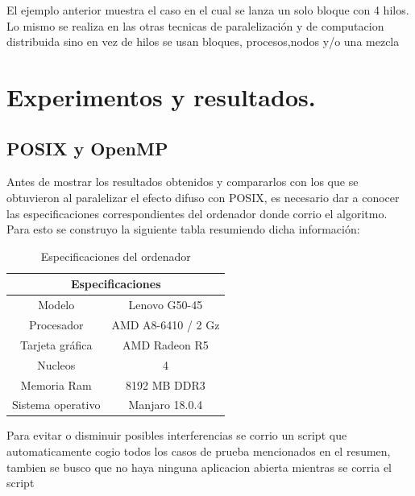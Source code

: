 \documentclass{IEEEtran}
\begin{document}
El ejemplo anterior muestra el caso en el cual se lanza un solo bloque con 4 hilos. Lo mismo se realiza 
en las otras tecnicas de  paralelización y de computacion distribuida sino en vez de hilos se usan bloques, procesos,nodos y/o una mezcla
\section{Experimentos y resultados.}
\subsection{POSIX y OpenMP}

Antes de mostrar los resultados obtenidos y compararlos con los que se obtuvieron al paralelizar el efecto difuso con POSIX, es necesario dar a conocer las especificaciones correspondientes del ordenador donde corrio el algoritmo. Para esto se construyo la siguiente tabla resumiendo dicha información:

\begin{table}[H]
\centering
    \begin{tabular}{ |c|c| } 
\hline
\multicolumn{2}{|c|}{Especificaciones} \\
\hline
Modelo & Lenovo G50-45\\
 \hline
 Procesador & AMD A8-6410 / 2 Gz \\ 
 \hline
 Tarjeta gráfica & AMD Radeon R5 \\ 
 \hline
 Nucleos & 4\\ 
 \hline
 Memoria Ram & 8192 MB DDR3
 \\ 
 \hline
 Sistema operativo & Manjaro 18.0.4 \\ 
 \hline
\end{tabular}
\caption{Especificaciones del ordenador}
\end{table}

Para evitar o disminuir posibles interferencias se corrio un script que automaticamente cogio todos los casos de prueba mencionados en el resumen, tambien se busco que no haya ninguna aplicacion abierta mientras se corria el script
\end{document}
